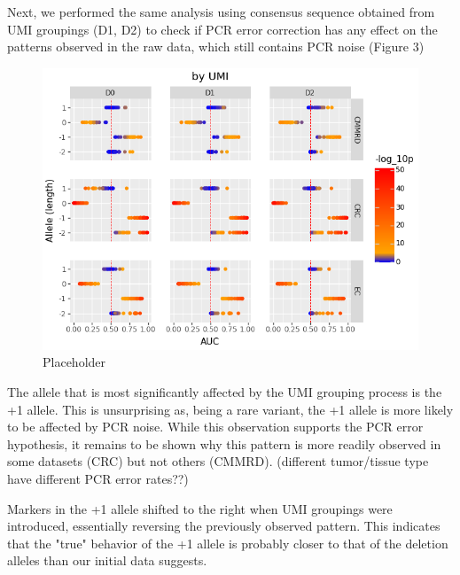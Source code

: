\documentclass[fleqn,10pt]{olplainarticle}
\begin{document}
Next, we performed the same analysis using consensus sequence obtained from UMI groupings (D1, D2) to check if PCR error correction has any effect on the patterns observed in the raw data, which still contains PCR noise (Figure 3)

\begin{figure}[h]
\includegraphics[scale=1]{"Figure2.png"}
\caption{Placeholder}
\end{figure}

The allele that is most significantly affected by the UMI grouping process is the +1 allele. This is unsurprising as, being a rare variant, the +1 allele is more likely to be affected by PCR noise. While this observation supports the PCR error hypothesis, it remains to be shown why this pattern is more readily observed in some datasets (CRC) but not others (CMMRD). (different tumor/tissue type have different PCR error rates??)

Markers in the +1 allele shifted to the right when UMI groupings were introduced, essentially reversing the previously observed pattern. This indicates that the "true" behavior of the +1 allele is probably closer to that of the deletion alleles than our initial data suggests.
\end{document}
